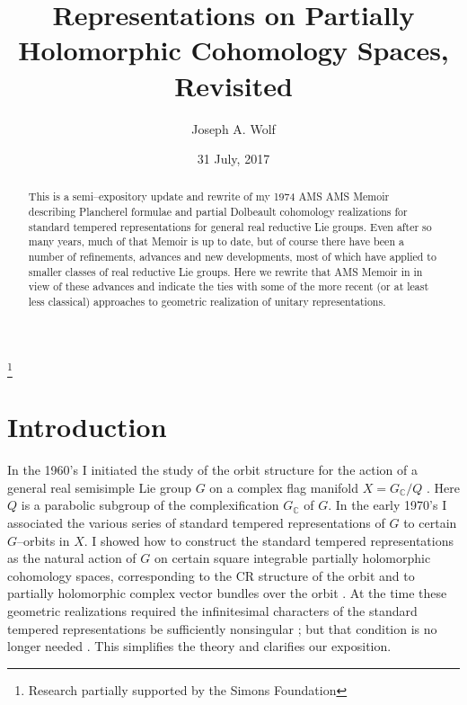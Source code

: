 \documentclass{conm-p-l}
\def\C{\mathbb{C}}
\begin{document}
\title[Representations on Partially Holomorphic Cohomology Spaces]
{Representations on Partially Holomorphic Cohomology Spaces, Revisited}

\author{Joseph A. Wolf}

\address{Department of Mathematics, University of California,
Berkeley, CA 94720--3840}
\curraddr{}
\thanks{Research partially supported by the Simons Foundation}

\date{31 July, 2017}

\begin{abstract} This is a semi--expository update and rewrite 
of my 1974 AMS AMS Memoir describing Plancherel formulae and
partial Dolbeault cohomology realizations for standard
tempered representations for general real reductive Lie groups.  
Even after so many years, much of that Memoir is up to date, but
of course there have been a number of refinements, advances and
new developments, most of which have applied to smaller classes
of real reductive Lie groups.  Here we rewrite that AMS Memoir in
in view of these advances and indicate the ties with some of the
more recent (or at least less classical)  approaches to geometric 
realization of unitary representations.
\end{abstract}

\maketitle

\setcounter{section}{-1}
\section{Introduction}\label{sec0} 
\setcounter{equation}{0}

In the 1960's I initiated the study of the orbit structure
for the action of a general real semisimple Lie group $G$ on a complex flag
manifold $X = G_\C/Q$ \cite{W1969}.  Here $Q$ is a parabolic subgroup of the
complexification $G_\C$ of $G$.  In the early 1970's I associated the 
various series of standard tempered representations of $G$ to certain 
$G$--orbits in $X$.  I showed how to construct the standard tempered 
representations as the natural action of $G$ on certain square integrable 
partially holomorphic cohomology spaces, corresponding to the CR structure 
of the orbit and to partially holomorphic complex vector bundles over the orbit
\cite{W1973}.  At the time these geometric realizations required the 
infinitesimal characters of the standard tempered representations be 
sufficiently nonsingular \cite{S1971}; but that condition is no longer needed
\cite{S1976}.  This simplifies the theory and clarifies
our exposition.
\end{document}
